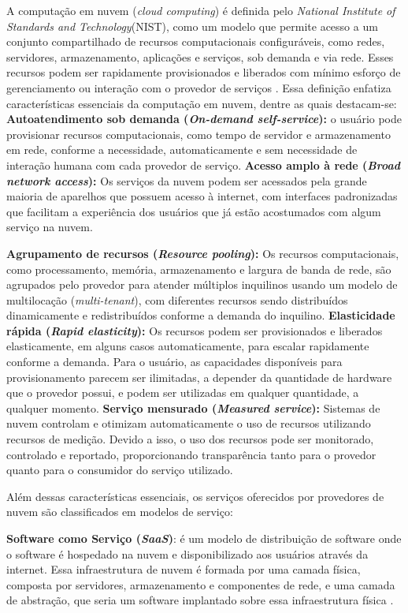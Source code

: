 A computação em nuvem (\textit{cloud computing}) é definida pelo \textit{National Institute of Standards and Technology}(NIST), como um modelo que permite acesso a um conjunto compartilhado de recursos computacionais configuráveis, como redes, servidores, armazenamento, aplicações e serviços,  sob demanda e via rede. Esses recursos podem ser rapidamente provisionados e liberados com mínimo esforço de gerenciamento ou interação com o provedor de serviços \cite{mell2011}. Essa definição enfatiza características essenciais da computação em nuvem, dentre as quais destacam-se: 
\textbf{Autoatendimento sob demanda (\textit{On-demand self-service}):} o usuário pode provisionar recursos computacionais, como tempo de servidor e armazenamento em rede, conforme a necessidade, automaticamente e sem necessidade de interação humana com cada provedor de serviço.
\textbf{Acesso amplo à rede (\textit{Broad network access}):} Os serviços da nuvem podem ser acessados pela grande maioria de aparelhos que possuem acesso à internet, com interfaces padronizadas que facilitam a experiência dos usuários que já estão acostumados com algum serviço na nuvem.
 
\textbf{Agrupamento de recursos (\textit{Resource pooling}):} Os recursos computacionais, como processamento, memória, armazenamento e largura de banda de rede, são agrupados pelo provedor para atender múltiplos inquilinos usando um modelo de multilocação (\textit{multi-tenant}), com diferentes recursos sendo distribuídos dinamicamente e redistribuídos conforme a demanda do inquilino.
\textbf{Elasticidade rápida (\textit{Rapid elasticity}):} Os recursos podem ser provisionados e liberados elasticamente, em alguns casos automaticamente, para escalar rapidamente conforme a demanda. Para o usuário, as capacidades disponíveis para provisionamento parecem ser ilimitadas, a depender da quantidade de hardware que o provedor possui,  e podem ser utilizadas em qualquer quantidade, a qualquer momento. 
\textbf{Serviço mensurado (\textit{Measured service}):} Sistemas de nuvem controlam e otimizam automaticamente o uso de recursos utilizando recursos de medição. Devido a isso, o uso dos recursos pode ser monitorado, controlado e reportado, proporcionando transparência tanto para o provedor quanto para o consumidor do serviço utilizado. 

Além dessas características essenciais, os serviços oferecidos por provedores de nuvem são classificados em modelos de serviço:

\textbf{Software como Serviço (\textit{SaaS})}: é um modelo de distribuição de software onde o software é hospedado na nuvem e disponibilizado aos usuários através da internet. Essa infraestrutura de nuvem é formada por uma camada física, composta por servidores, armazenamento e componentes de rede, e uma camada de abstração, que seria um software implantado sobre essa infraestrutura física \cite{mell2011}. 

